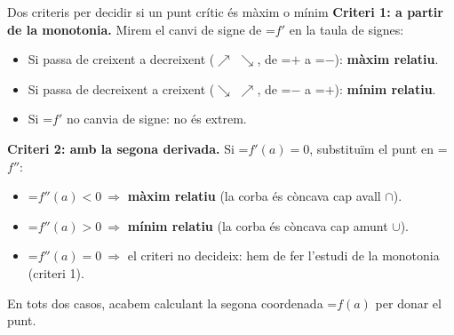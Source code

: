 \documentclass[11pt,a4paper]{article}
\newcommand{\lt}{<}\newcommand{\gt}{>}
\newcommand{\fmm}[1]{\setbox0=\hbox{$#1$}\ifdim\wd0>\linewidth\[#1\]\else\mbox{\box0}\fi}
\begin{document}
  
\begin{fmdef}{Dos criteris per decidir si un punt crític és màxim o mínim}
\textbf{Criteri 1: a partir de la monotonia.} Mirem el canvi de signe de \fmm{f'} en la taula de signes:

      
\begin{itemize}
\item Si passa de creixent a decreixent ($\nearrow$ $\searrow$, de \fmm{+} a \fmm{-}): \textbf{màxim relatiu}.
\item Si passa de decreixent a creixent ($\searrow$ $\nearrow$, de \fmm{-} a \fmm{+}): \textbf{mínim relatiu}.
\item Si \fmm{f'} no canvia de signe: no és extrem.
\end{itemize}

      

\textbf{Criteri 2: amb la segona derivada.} Si \fmm{f'(a)=0}, substituïm el punt en \fmm{f''}:

      
\begin{itemize}
\item \fmm{f''(a)\lt0\ \Rightarrow} \textbf{màxim relatiu} (la corba és còncava cap avall $\cap$).
\item \fmm{f''(a)\gt0\ \Rightarrow} \textbf{mínim relatiu} (la corba és còncava cap amunt $\cup$).
\item \fmm{f''(a)=0\ \Rightarrow} el criteri no decideix: hem de fer l'estudi de la monotonia (criteri 1).
\end{itemize}

      

En tots dos casos, acabem calculant la segona coordenada \fmm{f(a)} per donar el punt.
\end{fmdef}
\end{document}
